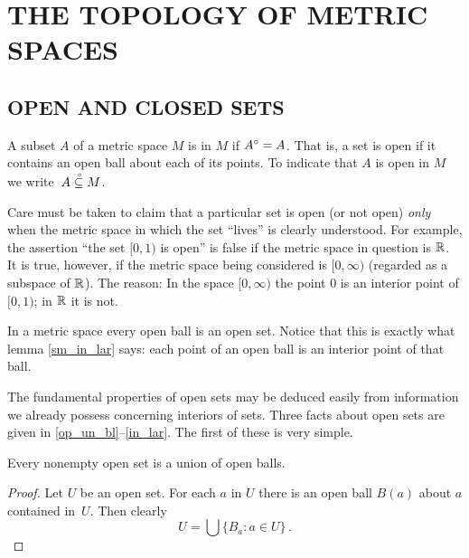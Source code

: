 \chapter{THE TOPOLOGY OF METRIC SPACES}

\section{OPEN AND CLOSED SETS}
\begin{defn} A subset $A$ of a metric space $M$ is
 in $M$ if $A^{\circ} = A$. That is, a set is open if it contains an open ball about
each of its points. To indicate that $A$ is open in $M$ we
write~$A\overset{\thickspace{}_\circ}{\subseteq}M$.
\end{defn}

\begin{exam}\label{subsp_vs_sp} Care must be taken to claim that a particular set is open
(or not open) \emph{only} when the metric space in which the set ``lives'' is clearly
understood. For example, the assertion ``the set $[0,1)$ is open'' is false if the metric
space in question is $\mathbb{R}$. It is true, however, if the metric space being considered is
$[0,\infty)$ (regarded as a subspace of $\mathbb{R}$). The reason: In the space $[0,\infty)$ the point
0 is an interior point of $[0,1)$; in $\mathbb{R}$ it is not.
\end{exam}

\begin{exam} In a metric space every open ball is an open set.  Notice that this is exactly what
lemma \ref{sm_in_lar} says:  each point of an open ball is an interior point of that ball.
\end{exam}

The fundamental properties of open sets may be deduced easily from information we already
possess concerning interiors of sets. Three facts about open sets are given in
\ref{op_un_bl}--\ref{in_lar}. The first of these is very simple.

\begin{prop}\label{op_un_bl} Every nonempty open set is a union of open balls.
\end{prop}

\begin{proof} Let $U$ be an open set. For each $a$ in $U$ there is an open ball $B(a)$ about
$a$ contained in~$U$. Then clearly
  \[ U = \textstyle\bigcup\{B_a\colon  a \in U\}\,. \]
\end{proof}

